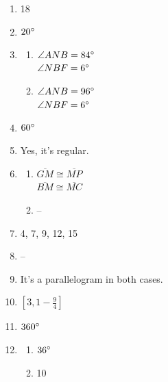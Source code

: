 \documentclass{article}
\begin{document}
\begin{enumerate}
\item 18

\item $20 \degree$

\item

	\begin{enumerate}
	
	\item $\angle ANB = 84 \degree$ \\
		$\angle NBF = 6 \degree$
		
	\item $\angle ANB = 96 \degree$ \\
		$\angle NBF = 6 \degree$
	
	\end{enumerate}
	
\item $60 \degree$

\item Yes, it's regular.

\item

	\begin{enumerate}
	
	\item $\overline{GM} \cong \overline{MP}$ \\
		$\overline{BM} \cong \overline{MC}$
		
	\item --
	
	\end{enumerate}
	
\item 4, 7, 9, 12, 15

\item --

\item It's a parallelogram in both cases.

\item $\left[ 3, 1 -\frac{9}{4} \right]$

\item $360\degree$

\item

	\begin{enumerate}
	
	\item $36 \degree$
	
	\item 10
	
	\end{enumerate}
	

\end{enumerate}
\end{document}
